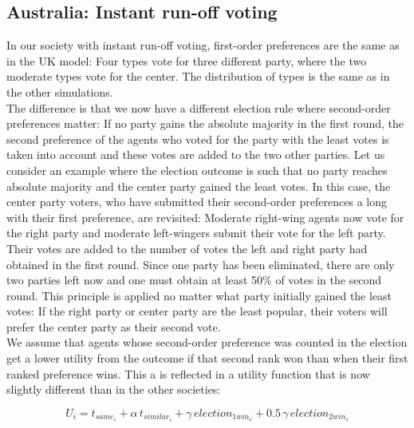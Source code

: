 \documentclass[12pt, a4paper]{article}
\begin{document}
\subsection{Australia: Instant run-off voting} 
 In our society with instant run-off voting, first-order preferences are the same as in the UK model: Four types vote for three different party, where the two moderate types vote for the center. The distribution of types is the same as in the other simulations. \\
 The difference is that we now have a different election rule where second-order preferences matter: If no party gains the absolute majority in the first round, the second preference of the agents who voted for the party with the least votes is taken into account and these votes are added to the two other parties. Let us consider an example where the election outcome is such that no party reaches absolute majority and the center party gained the least votes. In this case, the center party voters, who have submitted their second-order preferences a long with their first preference, are revisited: Moderate right-wing agents now vote for the right party and moderate left-wingers submit their vote for the left party. Their votes are added to the number of votes the left and right party had obtained in the first round. Since one party has been eliminated, there are only two parties left now and one must obtain at least 50\% of votes in the second round. This principle is applied no matter what party initially gained the least votes: If the right party or center party are the least popular, their voters will prefer the center party as their second vote. \\
 We assume that agents whose second-order preference was counted in the election get a lower utility from the outcome if that second rank won than when their first ranked preference wins. This a is reflected in a utility function that is now slightly different than in the other societies:
  
 \begin{equation}
 U_i=t_{same_i}+\alpha \, t_{similar_i}+\gamma \, election_{1win_c} + 0.5 \, \gamma \, election_{2win_c}
 \end{equation}
 
\end{document}
